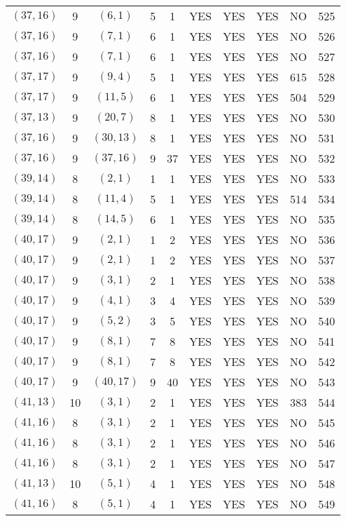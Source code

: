 \begin{longtable}{|c|c|c|c|c|c|c|c|c|c|}
$(37, 16)$ & 9 & $(6, 1)$ & 5 & 1 & YES & YES & YES & NO & 525\\
$(37, 16)$ & 9 & $(7, 1)$ & 6 & 1 & YES & YES & YES & NO & 526\\
$(37, 16)$ & 9 & $(7, 1)$ & 6 & 1 & YES & YES & YES & NO & 527\\
$(37, 17)$ & 9 & $(9, 4)$ & 5 & 1 & YES & YES & YES & 615 & 528\\
$(37, 17)$ & 9 & $(11, 5)$ & 6 & 1 & YES & YES & YES & 504 & 529\\
$(37, 13)$ & 9 & $(20, 7)$ & 8 & 1 & YES & YES & YES & NO & 530\\
$(37, 16)$ & 9 & $(30, 13)$ & 8 & 1 & YES & YES & YES & NO & 531\\
$(37, 16)$ & 9 & $(37, 16)$ & 9 & 37 & YES & YES & YES & NO & 532\\
$(39, 14)$ & 8 & $(2, 1)$ & 1 & 1 & YES & YES & YES & NO & 533\\
$(39, 14)$ & 8 & $(11, 4)$ & 5 & 1 & YES & YES & YES & 514 & 534\\
$(39, 14)$ & 8 & $(14, 5)$ & 6 & 1 & YES & YES & YES & NO & 535\\
$(40, 17)$ & 9 & $(2, 1)$ & 1 & 2 & YES & YES & YES & NO & 536\\
$(40, 17)$ & 9 & $(2, 1)$ & 1 & 2 & YES & YES & YES & NO & 537\\
$(40, 17)$ & 9 & $(3, 1)$ & 2 & 1 & YES & YES & YES & NO & 538\\
$(40, 17)$ & 9 & $(4, 1)$ & 3 & 4 & YES & YES & YES & NO & 539\\
$(40, 17)$ & 9 & $(5, 2)$ & 3 & 5 & YES & YES & YES & NO & 540\\
$(40, 17)$ & 9 & $(8, 1)$ & 7 & 8 & YES & YES & YES & NO & 541\\
$(40, 17)$ & 9 & $(8, 1)$ & 7 & 8 & YES & YES & YES & NO & 542\\
$(40, 17)$ & 9 & $(40, 17)$ & 9 & 40 & YES & YES & YES & NO & 543\\
$(41, 13)$ & 10 & $(3, 1)$ & 2 & 1 & YES & YES & YES & 383 & 544\\
$(41, 16)$ & 8 & $(3, 1)$ & 2 & 1 & YES & YES & YES & NO & 545\\
$(41, 16)$ & 8 & $(3, 1)$ & 2 & 1 & YES & YES & YES & NO & 546\\
$(41, 16)$ & 8 & $(3, 1)$ & 2 & 1 & YES & YES & YES & NO & 547\\
$(41, 13)$ & 10 & $(5, 1)$ & 4 & 1 & YES & YES & YES & NO & 548\\
$(41, 16)$ & 8 & $(5, 1)$ & 4 & 1 & YES & YES & YES & NO & 549\\

\end{longtable}
